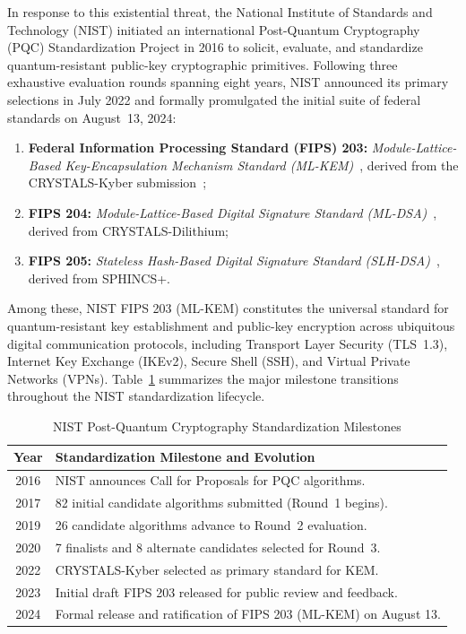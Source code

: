 In response to this existential threat, the National Institute of Standards and Technology (NIST) initiated an international Post-Quantum Cryptography (PQC) Standardization Project in 2016 to solicit, evaluate, and standardize quantum-resistant public-key cryptographic primitives. Following three exhaustive evaluation rounds spanning eight years, NIST announced its primary selections in July 2022 and formally promulgated the initial suite of federal standards on August~13, 2024:
\begin{enumerate}
    \item \textbf{Federal Information Processing Standard (FIPS) 203:} \textit{Module-Lattice-Based Key-Encapsulation Mechanism Standard (ML-KEM)}~\cite{fips203}, derived from the CRYSTALS-Kyber submission~\cite{bos2018kyber};
    \item \textbf{FIPS 204:} \textit{Module-Lattice-Based Digital Signature Standard (ML-DSA)}~\cite{fips204}, derived from CRYSTALS-Dilithium;
    \item \textbf{FIPS 205:} \textit{Stateless Hash-Based Digital Signature Standard (SLH-DSA)}~\cite{fips205}, derived from SPHINCS+.
\end{enumerate}
Among these, NIST FIPS 203 (ML-KEM) constitutes the universal standard for quantum-resistant key establishment and public-key encryption across ubiquitous digital communication protocols, including Transport Layer Security (TLS~1.3), Internet Key Exchange (IKEv2), Secure Shell (SSH), and Virtual Private Networks (VPNs). Table~\ref{tab:nist_timeline} summarizes the major milestone transitions throughout the NIST standardization lifecycle.

\begin{table}[t]
\caption{NIST Post-Quantum Cryptography Standardization Milestones}
\label{tab:nist_timeline}
\centering
\footnotesize
\begin{tabular}{@{}c p{6.8cm}@{}}
\toprule
\textbf{Year} & \textbf{Standardization Milestone and Evolution} \\
\midrule
2016 & NIST announces Call for Proposals for PQC algorithms. \\
2017 & 82 initial candidate algorithms submitted (Round~1 begins). \\
2019 & 26 candidate algorithms advance to Round~2 evaluation. \\
2020 & 7 finalists and 8 alternate candidates selected for Round~3. \\
2022 & CRYSTALS-Kyber selected as primary standard for KEM. \\
2023 & Initial draft FIPS 203 released for public review and feedback. \\
2024 & Formal release and ratification of FIPS 203 (ML-KEM) on August 13. \\
\bottomrule
\end{tabular}
\end{table}

